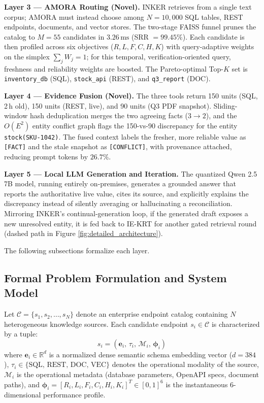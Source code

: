 \documentclass[journal,10pt,twocolumn]{IEEEtran}
\begin{document}
\textbf{Layer 3 --- AMORA Routing (Novel).} INKER retrieves from a single text corpus; AMORA must instead choose among $N = 10{,}000$ SQL tables, REST endpoints, documents, and vector stores. The two-stage FAISS funnel prunes the catalog to $M = 55$ candidates in $3.26\,\text{ms}$ (SRR $= 99.45\%$). Each candidate is then profiled across six objectives ($R, L, F, C, H, K$) with query-adaptive weights on the simplex $\sum_j W_j = 1$; for this temporal, verification-oriented query, freshness and reliability weights are boosted. The Pareto-optimal Top-$K$ set is \texttt{inventory\_db} (SQL), \texttt{stock\_api} (REST), and \texttt{q3\_report} (DOC).

\textbf{Layer 4 --- Evidence Fusion (Novel).} The three tools return 150 units (SQL, 2\,h old), 150 units (REST, live), and 90 units (Q3 PDF snapshot). Sliding-window hash deduplication merges the two agreeing facts ($3 \rightarrow 2$), and the $O(E^2)$ entity conflict graph flags the 150-vs-90 discrepancy for the entity \texttt{stock(SKU-1042)}. The fused context labels the fresher, more reliable value as \texttt{[FACT]} and the stale snapshot as \texttt{[CONFLICT]}, with provenance attached, reducing prompt tokens by $26.7\%$.

\textbf{Layer 5 --- Local LLM Generation and Iteration.} The quantized Qwen 2.5 7B model, running entirely on-premises, generates a grounded answer that reports the authoritative live value, cites its source, and explicitly explains the discrepancy instead of silently averaging or hallucinating a reconciliation. Mirroring INKER's continual-generation loop, if the generated draft exposes a new unresolved entity, it is fed back to IE-KRT for another gated retrieval round (dashed path in Figure \ref{fig:detailed_architecture}).

The following subsections formalize each layer.

\subsection{Formal Problem Formulation and System Model}
Let $\mathcal{C} = \{s_1, s_2, \dots, s_N\}$ denote an enterprise endpoint catalog containing $N$ heterogeneous knowledge sources. Each candidate endpoint $s_i \in \mathcal{C}$ is characterized by a tuple:
\begin{equation}
    s_i = \left( \mathbf{e}_i, \, \tau_i, \, \mathcal{M}_i, \, \boldsymbol{\phi}_i \right)
\end{equation}
where $\mathbf{e}_i \in \mathbb{R}^d$ is a normalized dense semantic schema embedding vector ($d = 384$), $\tau_i \in \{\text{SQL}, \, \text{REST}, \, \text{DOC}, \, \text{VEC}\}$ denotes the operational modality of the source, $\mathcal{M}_i$ is the operational metadata (database parameters, OpenAPI specs, document paths), and $\boldsymbol{\phi}_i = [R_i, L_i, F_i, C_i, H_i, K_i]^T \in [0, 1]^6$ is the instantaneous 6-dimensional performance profile.
\end{document}
